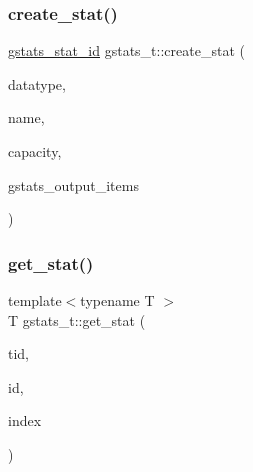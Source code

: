 \mbox{\label{classgstats__t_a6f6442c5e217300004d009330f655d81}} 
\subsubsection{\texorpdfstring{create\+\_\+stat()}{create\_stat()}}
{\footnotesize\ttfamily \hyperlink{gstats_8h_a662beb90f6d56f5ee9df4d812d39aa33}{gstats\+\_\+stat\+\_\+id} gstats\+\_\+t\+::create\+\_\+stat (\begin{DoxyParamCaption}\item[{\hyperlink{gstats_8h_add042cd26594ae31bc443952e37d30f6}{gstats\+\_\+enum\+\_\+data\+\_\+type}}]{datatype,  }\item[{std\+::string}]{name,  }\item[{const int}]{capacity,  }\item[{std\+::initializer\+\_\+list$<$ \hyperlink{classgstats__output__item}{gstats\+\_\+output\+\_\+item} $>$}]{gstats\+\_\+output\+\_\+items }\end{DoxyParamCaption})\hspace{0.3cm}{\ttfamily [inline]}}

\mbox{\label{classgstats__t_aa5de3ae993697b4520ed7916d3ee3373}} 
\subsubsection{\texorpdfstring{get\+\_\+stat()}{get\_stat()}}
{\footnotesize\ttfamily template$<$typename T $>$ \\
T gstats\+\_\+t\+::get\+\_\+stat (\begin{DoxyParamCaption}\item[{const int}]{tid,  }\item[{const \hyperlink{gstats_8h_a662beb90f6d56f5ee9df4d812d39aa33}{gstats\+\_\+stat\+\_\+id}}]{id,  }\item[{const int}]{index }\end{DoxyParamCaption})\hspace{0.3cm}{\ttfamily [inline]}}

\mbox{\label{classgstats__t_a3529ce1c55852403a24c299625fcce20}} 
